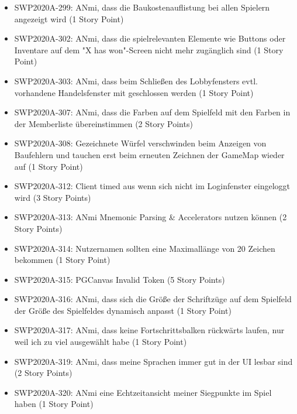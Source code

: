 \documentclass[12pt,a4paper, oneside]{article}
\begin{document}
\begin{itemize}
        \item SWP2020A-299: ANmi, dass die Baukostenauflistung bei allen Spielern angezeigt wird (1 Story Point)

        \item SWP2020A-302: ANmi, dass die spielrelevanten Elemente wie Buttons oder Inventare auf dem "X has won"-Screen nicht mehr zugänglich sind (1 Story Point)

        \item SWP2020A-303: ANmi, dass beim Schließen des Lobbyfensters evtl. vorhandene Handelsfenster mit geschlossen werden (1 Story Point)

        \item SWP2020A-307: ANmi, dass die Farben auf dem Spielfeld mit den Farben in der Memberliste übereinstimmen (2 Story Points)

        \item SWP2020A-308: Gezeichnete Würfel verschwinden beim Anzeigen von Baufehlern und tauchen erst beim erneuten Zeichnen der GameMap wieder auf (1 Story Point)

        \item SWP2020A-312: Client timed aus wenn sich nicht im Loginfenster eingeloggt wird (3 Story Points)

        \item SWP2020A-313: ANmi Mnemonic Parsing & Accelerators nutzen können (2 Story Points)

        \item SWP2020A-314: Nutzernamen sollten eine Maximallänge von 20 Zeichen bekommen (1 Story Point)

        \item SWP2020A-315: PGCanvas Invalid Token (5 Story Points)

        \item SWP2020A-316: ANmi, dass sich die Größe der Schriftzüge auf dem Spielfeld der Größe des Spielfeldes dynamisch anpasst (1 Story Point)

        \item SWP2020A-317: ANmi, dass keine Fortschrittsbalken rückwärts laufen, nur weil ich zu viel ausgewählt habe (1 Story Point)

        \item SWP2020A-319: ANmi, dass meine Sprachen immer gut in der UI lesbar sind (2 Story Points)

        \item SWP2020A-320: ANmi eine Echtzeitansicht meiner Siegpunkte im Spiel haben (1 Story Point)


\end{itemize}
\end{document}
